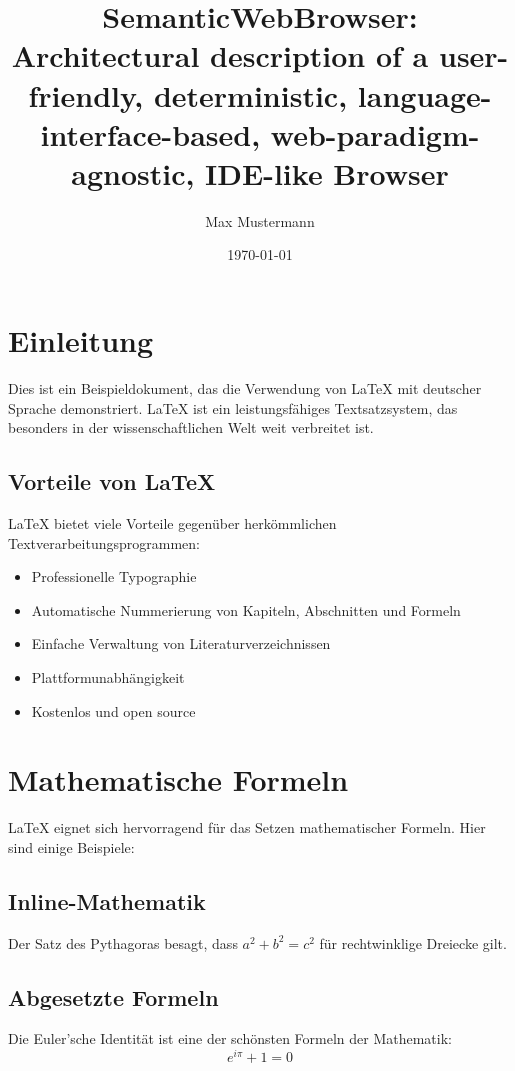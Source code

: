 \documentclass[12pt,a4paper]{article}
\title{SemanticWebBrowser: Architectural description of a user-friendly, deterministic, language-interface-based, web-paradigm-agnostic, IDE-like Browser}
\author{Max Mustermann}
\date{\today}
\begin{document}
\maketitle

\tableofcontents
\newpage

\section{Einleitung}

Dies ist ein Beispieldokument, das die Verwendung von LaTeX mit deutscher Sprache demonstriert. LaTeX ist ein leistungsfähiges Textsatzsystem, das besonders in der wissenschaftlichen Welt weit verbreitet ist.

\subsection{Vorteile von LaTeX}

LaTeX bietet viele Vorteile gegenüber herkömmlichen Textverarbeitungsprogrammen:

\begin{itemize}
    \item Professionelle Typographie
    \item Automatische Nummerierung von Kapiteln, Abschnitten und Formeln
    \item Einfache Verwaltung von Literaturverzeichnissen
    \item Plattformunabhängigkeit
    \item Kostenlos und open source
\end{itemize}

\section{Mathematische Formeln}

LaTeX eignet sich hervorragend für das Setzen mathematischer Formeln. Hier sind einige Beispiele:

\subsection{Inline-Mathematik}
Der Satz des Pythagoras besagt, dass $a^2 + b^2 = c^2$ für rechtwinklige Dreiecke gilt.

\subsection{Abgesetzte Formeln}
Die Euler'sche Identität ist eine der schönsten Formeln der Mathematik:
\begin{equation}
    e^{i\pi} + 1 = 0
\end{equation}
\end{document}
